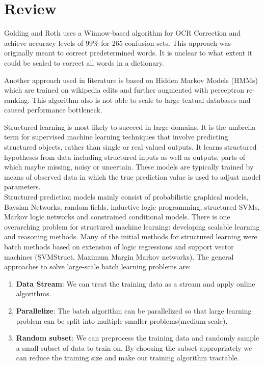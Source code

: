 \documentclass{article}
\begin{document}
\section{Review} 

Golding and Roth \cite{winnow} uses a Winnow-based algorithm for OCR Correction and achieve accuracy levels of 99\% for 265 confusion sets. This approach was originally meant to correct predetermined words. It is unclear to what extent it could be scaled to correct all words in a dictionary. 

Another approach used in literature \cite{wikiedits} is based on Hidden Markov Models (HMMs) which are trained on wikipedia edits and further augmented with perceptron re-ranking. This algorithm also is not able to scale to large textual databases and caused performance bottleneck.

Structured learning is most likely to succeed in large domains. It is the umbrella term for supervised machine learning techniques that involve predicting structured objects, rather than single or real valued outputs.
It learns structured hypotheses from data including structured inputs as well as outputs, parts of which maybe missing, noisy or uncertain.
These models are typically trained by means of observed data in which the true prediction value is used to adjust model parameters.\\
Structured prediction models mainly consist of probabilistic graphical models, Baysian Networks, random fields, inductive logic programming, structured SVMs, Markov logic networks and constrained conditional models.
There is one overarching problem for structured machine learning: developing scalable learning and reasoning methods. Many of the initial methods for structured learning were batch methods based on extension of logic regressions and support vector machines (SVMStruct, Maximum Margin Markov networks). 
The general approaches to solve large-scale batch learning problems are:
\begin{enumerate}
\item \textbf{Data Stream}: We can treat the training data as a stream and apply online algorithms.
\item \textbf{Parallelize}: The batch algorithm can be parallelized so that large learning problem can be split into multiple smaller problems(medium-scale).
\item \textbf{Random subset}: We can preprocess the training data and randomly sample a small subset of data to train on. By choosing the subset appropriately we can reduce the training size and make our training algorithm tractable.
\end{enumerate}
\end{document}
